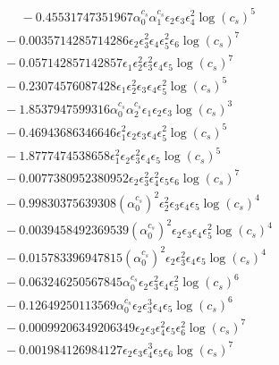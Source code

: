 \documentclass[10pt]{article}
\begin{document}
\begin{align*}
\phantom{F_{s,7}} &\phantom{={}}{}  - 0.45531747351967 \alpha_{0}^{c_s} \alpha_{1}^{c_s} \epsilon_{2} \epsilon_{3} \epsilon_{4}^{2} \log{\left(c_{s} \right)}^{5} \\
&{}  - 0.0035714285714286 \epsilon_{2} \epsilon_{3}^{2} \epsilon_{4} \epsilon_{5}^{2} \epsilon_{6} \log{\left(c_{s} \right)}^{7} \\
&{}  - 0.057142857142857 \epsilon_{1} \epsilon_{2}^{2} \epsilon_{3}^{2} \epsilon_{4} \epsilon_{5} \log{\left(c_{s} \right)}^{7} \\
&{}  - 0.23074576087428 \epsilon_{1} \epsilon_{2}^{2} \epsilon_{3} \epsilon_{4} \epsilon_{5}^{2} \log{\left(c_{s} \right)}^{5} \\
&{}  - 1.8537947599316 \alpha_{0}^{c_s} \alpha_{2}^{c_s} \epsilon_{1} \epsilon_{2} \epsilon_{3} \log{\left(c_{s} \right)}^{3} \\
&{}  - 0.46943686346646 \epsilon_{1}^{2} \epsilon_{2} \epsilon_{3} \epsilon_{4} \epsilon_{5}^{2} \log{\left(c_{s} \right)}^{5} \\
&{}  - 1.8777474538658 \epsilon_{1}^{2} \epsilon_{2} \epsilon_{3}^{2} \epsilon_{4} \epsilon_{5} \log{\left(c_{s} \right)}^{5} \\
&{}  - 0.0077380952380952 \epsilon_{2} \epsilon_{3}^{2} \epsilon_{4}^{2} \epsilon_{5} \epsilon_{6} \log{\left(c_{s} \right)}^{7} \\
&{}  - 0.99830375639308 \left(\alpha_{0}^{c_s}\right)^{2} \epsilon_{2}^{2} \epsilon_{3} \epsilon_{4} \epsilon_{5} \log{\left(c_{s} \right)}^{4} \\
&{}  - 0.0039458492369539 \left(\alpha_{0}^{c_s}\right)^{2} \epsilon_{2} \epsilon_{3} \epsilon_{4} \epsilon_{5}^{2} \log{\left(c_{s} \right)}^{4} \\
&{}  - 0.015783396947815 \left(\alpha_{0}^{c_s}\right)^{2} \epsilon_{2} \epsilon_{3}^{2} \epsilon_{4} \epsilon_{5} \log{\left(c_{s} \right)}^{4} \\
&{}  - 0.063246250567845 \alpha_{0}^{c_s} \epsilon_{2} \epsilon_{3}^{2} \epsilon_{4} \epsilon_{5}^{2} \log{\left(c_{s} \right)}^{6} \\
&{}  - 0.12649250113569 \alpha_{0}^{c_s} \epsilon_{2} \epsilon_{3}^{3} \epsilon_{4} \epsilon_{5} \log{\left(c_{s} \right)}^{6} \\
&{}  - 0.00099206349206349 \epsilon_{2} \epsilon_{3} \epsilon_{4}^{2} \epsilon_{5} \epsilon_{6}^{2} \log{\left(c_{s} \right)}^{7} \\
&{}  - 0.001984126984127 \epsilon_{2} \epsilon_{3} \epsilon_{4}^{3} \epsilon_{5} \epsilon_{6} \log{\left(c_{s} \right)}^{7} \\

\end{align*}
\end{document}
